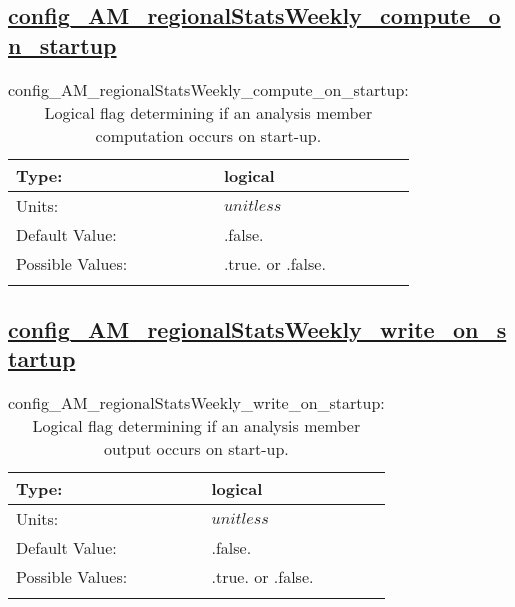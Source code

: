 \subsection[config\_AM\_regionalStatsWeekly\_compute\_on\_startup]{\hyperref[sec:nm_tab_AM_regionalStatsWeekly]{config\_AM\_regionalStatsWeekly\_compute\_on\_startup}}
\label{subsec:nm_sec_config_AM_regionalStatsWeekly_compute_on_startup}
\begin{center}
\begin{longtable}{| p{2.0in} || p{4.0in} |}
    \hline
    Type: & logical \\
    \hline
    Units: & $unitless$ \\
    \hline
    Default Value: & .false. \\
    \hline
    Possible Values: & .true. or .false. \\
    \hline
    \caption{config\_AM\_regionalStatsWeekly\_compute\_on\_startup: Logical flag determining if an analysis member computation occurs on start-up.}
\end{longtable}
\end{center}
\subsection[config\_AM\_regionalStatsWeekly\_write\_on\_startup]{\hyperref[sec:nm_tab_AM_regionalStatsWeekly]{config\_AM\_regionalStatsWeekly\_write\_on\_startup}}
\label{subsec:nm_sec_config_AM_regionalStatsWeekly_write_on_startup}
\begin{center}
\begin{longtable}{| p{2.0in} || p{4.0in} |}
    \hline
    Type: & logical \\
    \hline
    Units: & $unitless$ \\
    \hline
    Default Value: & .false. \\
    \hline
    Possible Values: & .true. or .false. \\
    \hline
    \caption{config\_AM\_regionalStatsWeekly\_write\_on\_startup: Logical flag determining if an analysis member output occurs on start-up.}
\end{longtable}
\end{center}
